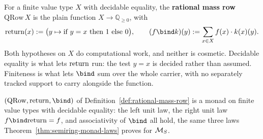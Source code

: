 \begin{definition}
\label{def:rational-mass-row}
\leanok
For a finite value type $X$ with decidable equality, the
\textbf{rational mass row} $\mathrm{QRow}\,X$ is the plain function
$X \to \mathbb Q_{\ge 0}$, with
\[
  \Ret(x) := \bigl(y \mapsto \text{if } y = x \text{ then } 1 \text{
  else } 0\bigr), \qquad
  (f \bind k)(y) := \sum_{x \in X} f(x) \cdot k(x)(y).
\]
Both hypotheses on $X$ do computational work, and neither is
cosmetic. Decidable equality is what lets $\mathrm{return}$ run: the test $y = x$
is decided rather than assumed. Finiteness is what lets $\bind$ sum
over the whole carrier, with no separately tracked support to carry
alongside the function.
\end{definition}

\begin{theorem}
\label{thm:rational-mass-row-monad}
\leanok
$(\mathrm{QRow}, \Ret, \bind)$ of Definition~\ref{def:rational-mass-row}
is a monad on finite value types with decidable equality: the left unit
law, the right unit law $f \bind \Ret = f$, and associativity of
$\bind$ all hold, the same three laws
Theorem~\ref{thm:semiring-monad-laws} proves for $\mathcal M_{S}$.
\end{theorem}

